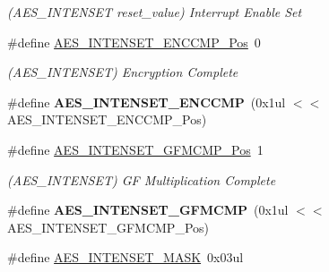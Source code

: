 \begin{DoxyCompactItemize}
\begin{DoxyCompactList}\small\item\em (A\+E\+S\+\_\+\+I\+N\+T\+E\+N\+S\+E\+T reset\+\_\+value) Interrupt Enable Set \end{DoxyCompactList}\item 
\hypertarget{group___s_a_m_l21___a_e_s_ga62a56a2e423ef41dd36947677b3be1e6}{}\#define \hyperlink{group___s_a_m_l21___a_e_s_ga62a56a2e423ef41dd36947677b3be1e6}{A\+E\+S\+\_\+\+I\+N\+T\+E\+N\+S\+E\+T\+\_\+\+E\+N\+C\+C\+M\+P\+\_\+\+Pos}~0\label{group___s_a_m_l21___a_e_s_ga62a56a2e423ef41dd36947677b3be1e6}

\begin{DoxyCompactList}\small\item\em (A\+E\+S\+\_\+\+I\+N\+T\+E\+N\+S\+E\+T) Encryption Complete \end{DoxyCompactList}\item 
\hypertarget{group___s_a_m_l21___a_e_s_gad9366fdb4b380bf689ea37e1ab876390}{}\#define {\bfseries A\+E\+S\+\_\+\+I\+N\+T\+E\+N\+S\+E\+T\+\_\+\+E\+N\+C\+C\+M\+P}~(0x1ul $<$$<$ A\+E\+S\+\_\+\+I\+N\+T\+E\+N\+S\+E\+T\+\_\+\+E\+N\+C\+C\+M\+P\+\_\+\+Pos)\label{group___s_a_m_l21___a_e_s_gad9366fdb4b380bf689ea37e1ab876390}

\item 
\hypertarget{group___s_a_m_l21___a_e_s_gaafaf0866499eeb2c3ffadc68c2e99bb6}{}\#define \hyperlink{group___s_a_m_l21___a_e_s_gaafaf0866499eeb2c3ffadc68c2e99bb6}{A\+E\+S\+\_\+\+I\+N\+T\+E\+N\+S\+E\+T\+\_\+\+G\+F\+M\+C\+M\+P\+\_\+\+Pos}~1\label{group___s_a_m_l21___a_e_s_gaafaf0866499eeb2c3ffadc68c2e99bb6}

\begin{DoxyCompactList}\small\item\em (A\+E\+S\+\_\+\+I\+N\+T\+E\+N\+S\+E\+T) G\+F Multiplication Complete \end{DoxyCompactList}\item 
\hypertarget{group___s_a_m_l21___a_e_s_gaa682b8f8d98fafcddc7941ff549e7d50}{}\#define {\bfseries A\+E\+S\+\_\+\+I\+N\+T\+E\+N\+S\+E\+T\+\_\+\+G\+F\+M\+C\+M\+P}~(0x1ul $<$$<$ A\+E\+S\+\_\+\+I\+N\+T\+E\+N\+S\+E\+T\+\_\+\+G\+F\+M\+C\+M\+P\+\_\+\+Pos)\label{group___s_a_m_l21___a_e_s_gaa682b8f8d98fafcddc7941ff549e7d50}

\item 
\hypertarget{group___s_a_m_l21___a_e_s_gac931ed9e37384df0876640e451699362}{}\#define \hyperlink{group___s_a_m_l21___a_e_s_gac931ed9e37384df0876640e451699362}{A\+E\+S\+\_\+\+I\+N\+T\+E\+N\+S\+E\+T\+\_\+\+M\+A\+S\+K}~0x03ul\label{group___s_a_m_l21___a_e_s_gac931ed9e37384df0876640e451699362}


\end{DoxyCompactItemize}
